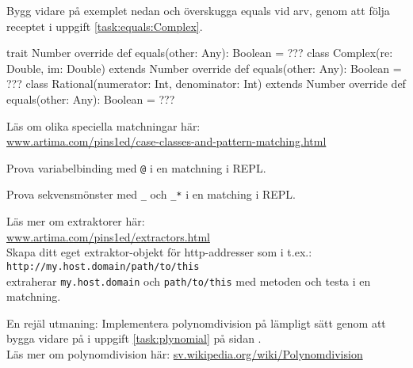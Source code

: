 \Task Bygg vidare på exemplet nedan och överskugga equals vid arv, genom att följa receptet i uppgift \ref{task:equals:Complex}. 
\begin{Code}
trait Number {
  override def equals(other: Any): Boolean = ???
}
class Complex(re: Double, im: Double) extends Number {
  override def equals(other: Any): Boolean = ???
}
class Rational(numerator: Int, denominator: Int) extends Number {
  override def equals(other: Any): Boolean = ???
}
\end{Code}
    

\Task Läs om olika speciella matchningar här: \\
\href{http://www.artima.com/pins1ed/case-classes-and-pattern-matching.html}{www.artima.com/pins1ed/case-classes-and-pattern-matching.html}

\Subtask Prova variabelbinding med \texttt{@} i en matchning i REPL. 

\Subtask Prova sekvensmönster med \texttt{\_} och \texttt{\_*} i en matching i REPL.

\Task \label{task:extractor} Läs mer om extraktorer här: \\ \href{http://www.artima.com/pins1ed/extractors.html}{www.artima.com/pins1ed/extractors.html} \\ 
Skapa ditt eget extraktor-objekt för http-addresser som i t.ex.: \\
\texttt{http://my.host.domain/path/to/this} \\ extraherar \texttt{my.host.domain} och \texttt{path/to/this} med metoden  och testa i en matchning.




\Task En rejäl utmaning: Implementera polynomdivision på lämpligt sätt genom att bygga vidare på   i  uppgift \ref{task:plynomial} på sidan \pageref{task:plynomial}.  \\ Läs mer om polynomdivision här: \href{https://sv.wikipedia.org/wiki/Polynomdivision}{sv.wikipedia.org/wiki/Polynomdivision}





